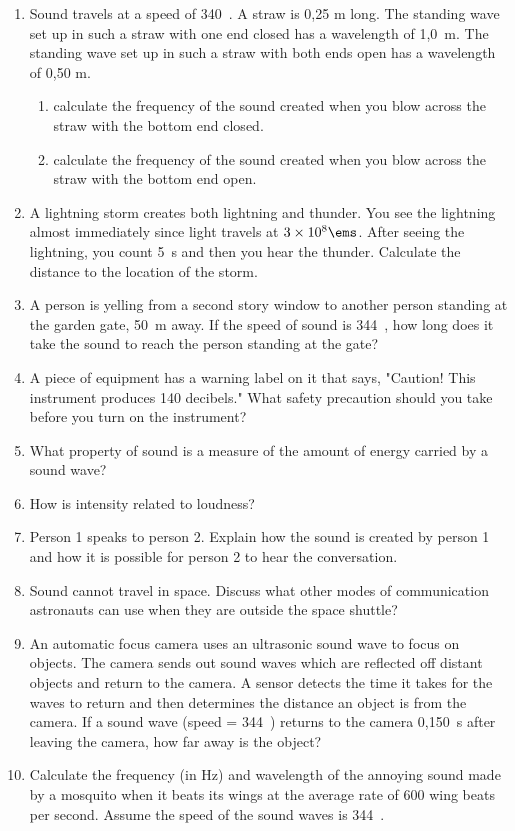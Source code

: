 \begin{eocexercises}{}
\begin{enumerate}
\item{Sound travels at a speed of 340~\ms. A straw is 0,25 m long. The standing wave set up in such a straw with one end closed has a wavelength of 1,0~m. The standing wave set up in such a straw with both ends open has a wavelength of 0,50 m.
\begin{enumerate}[label=\textbf{\alph*}.]
\item calculate the frequency of the sound created when you blow across the straw with the bottom end closed.
\item calculate the frequency of the sound created when you blow across the straw with the bottom end open.
\end{enumerate}}
\item{A lightning storm creates both lightning and thunder. You see the lightning almost immediately since light travels at $3\times10^{8}\ems$. After seeing the lightning, you count 5~s and then you hear the thunder. Calculate the distance to the location of the storm.}
\item{A person is yelling from a second story window to another person standing at the garden gate, 50~m away. If the speed of sound is 344~\ms, how long does it take the sound to reach the person standing at the gate?}
\item{A piece of equipment has a warning label on it that says, "Caution! This instrument produces 140 decibels." What safety precaution should you take before you turn on the instrument?}
\item{What property of sound is a measure of the amount of energy carried by a sound wave?}
\item{How is intensity related to loudness?}
\item Person 1 speaks to person 2. Explain how the sound is created by person 1 and how it is possible for person 2 to hear the conversation.
\item{Sound cannot travel in space. Discuss what other modes of communication astronauts can use when they are outside the space shuttle?}
\item{An automatic focus camera uses an ultrasonic sound wave to focus on objects. The camera sends out sound waves which are reflected off distant objects and return to the camera. A sensor detects the time it takes for the waves to return and then determines the distance an object is from the camera. If a sound wave (speed = 344~\ms) returns to the camera 0,150~s after leaving the camera, how far away is the object?}
\item{Calculate the frequency (in Hz) and wavelength of the annoying sound made by a mosquito when it beats its wings at the average rate of 600 wing beats per second. Assume the speed of the sound waves is 344~\ms.}

\end{enumerate}
\end{eocexercises}
